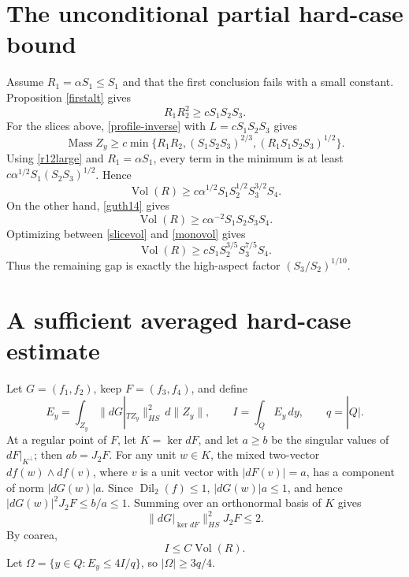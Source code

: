 \documentclass[12pt]{article}
\newcommand{\Dil}{\operatorname{Dil}}
\newcommand{\Vol}{\operatorname{Vol}}
\newcommand{\Mass}{\operatorname{Mass}}
\begin{document}
\section*{The unconditional partial hard-case bound}

Assume \(R_1=\alpha S_1\le S_1\) and that the first conclusion fails with a
small constant.  Proposition \ref{firstalt} gives
\begin{equation}\label{r12large}
        R_1R_2^2\ge cS_1S_2S_3 .
\end{equation}
For the slices above, \eqref{profile-inverse} with
\(L=cS_1S_2S_3\) gives
\[
\Mass Z_y\ge c\min\{R_1R_2,(S_1S_2S_3)^{2/3},
                         (R_1S_1S_2S_3)^{1/2}\}.
\]
Using \eqref{r12large} and \(R_1=\alpha S_1\), every term in the minimum is
at least \(c\alpha^{1/2}S_1(S_2S_3)^{1/2}\).  Hence
\begin{equation}\label{slicevol}
        \Vol(R)\ge
        c\alpha^{1/2}S_1S_2^{1/2}S_3^{3/2}S_4 .
\end{equation}
On the other hand, \eqref{guth14} gives
\begin{equation}\label{monovol}
        \Vol(R)\ge
        c\alpha^{-2}S_1S_2S_3S_4 .
\end{equation}
Optimizing between \eqref{slicevol} and \eqref{monovol} gives
\[
        \Vol(R)\ge cS_1S_2^{3/5}S_3^{7/5}S_4 .
\]
Thus the remaining gap is exactly the high-aspect factor
\((S_3/S_2)^{1/10}\).

\section*{A sufficient averaged hard-case estimate}

Let \(G=(f_1,f_2)\), keep \(F=(f_3,f_4)\), and define
\[
E_y=\int_{Z_y}\|dG|_{TZ_y}\|_{HS}^2\,d\|Z_y\|,\qquad
I=\int_QE_y\,dy,\qquad q=|Q|.
\]
At a regular point of \(F\), let \(K=\ker dF\), and let \(a\ge b\) be the
singular values of \(dF|_{K^\perp}\); then \(ab=J_2F\).  For any unit
\(w\in K\), the mixed two-vector \(df(w)\wedge df(v)\), where \(v\) is a
unit vector with \(|dF(v)|=a\), has a component of norm
\(|dG(w)|a\).  Since \(\Dil_2(f)\le1\), \(|dG(w)|a\le1\), and hence
\(|dG(w)|^2J_2F\le b/a\le1\).  Summing over an orthonormal basis of \(K\)
gives
\[
        \|dG|_{\ker dF}\|_{HS}^2J_2F\le2 .
\]
By coarea,
\begin{equation}\label{Icoarea}
        I\le C\Vol(R).
\end{equation}
Let \(\Omega=\{y\in Q:E_y\le4I/q\}\), so \(|\Omega|\ge3q/4\).
\end{document}
